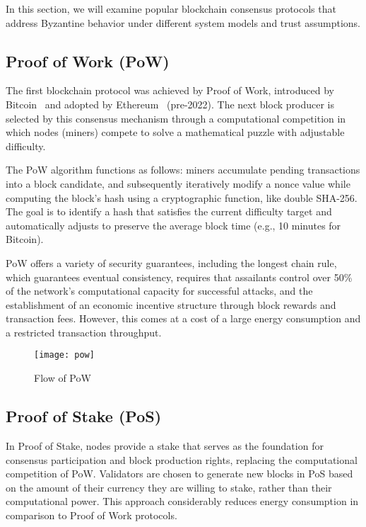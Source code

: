 In this section, we will examine popular blockchain consensus protocols that address Byzantine
behavior under different system models and trust assumptions.

\subsection{Proof of Work (PoW)}\label{sub:pow}

The first blockchain protocol was achieved by
Proof of Work, introduced by Bitcoin~\cite{bitcoin} and adopted by Ethereum~\cite{ethereum} (pre-2022).
The next block producer is selected by this consensus mechanism through a computational competition
in which nodes (miners) compete to solve a mathematical puzzle with adjustable difficulty.

The PoW algorithm functions as follows: miners accumulate pending transactions into a block
candidate, and subsequently iteratively modify a nonce value while computing the block's hash
using a cryptographic function, like double SHA-256. The goal is to identify a hash that satisfies
the current difficulty target and automatically adjusts to preserve the average block time (e.g., 10 minutes for Bitcoin).

PoW offers a variety of security guarantees, including the longest chain rule, which
guarantees eventual consistency, requires that assailants control over 50\% of
the network's computational capacity for successful attacks, and the establishment of an
economic incentive structure through block rewards and transaction fees. However, this
comes at a cost of a large energy consumption and a restricted transaction throughput.

\begin{figure}[h]
	\centering
	\texttt{[image: pow]}
	\caption{Flow of PoW}
	\label{fig:pow}
\end{figure}

\subsection{Proof of Stake (PoS)}\label{sub:pos}

In Proof of Stake, nodes provide a stake that serves as the foundation
for consensus participation and block production rights, replacing the computational competition of PoW. 
Validators are chosen to generate new blocks in PoS based on the amount of their currency
they are willing to stake, rather than their computational power. This approach
considerably reduces energy consumption in comparison to Proof of Work protocols.
  
